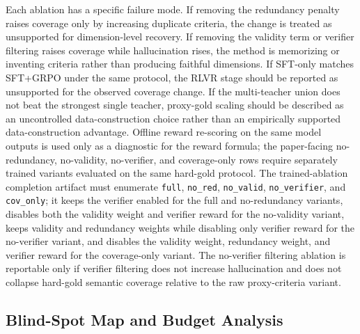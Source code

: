 Each ablation has a specific failure mode. If removing the redundancy penalty
raises coverage only by increasing duplicate criteria, the change is treated as
unsupported for dimension-level recovery. If removing the validity term or
verifier filtering raises coverage while hallucination rises, the method is
memorizing or inventing criteria rather than producing faithful dimensions. If
SFT-only matches SFT+GRPO under the same protocol, the RLVR stage should be
reported as unsupported for the observed coverage change. If the multi-teacher union does
not beat the strongest single teacher, proxy-gold scaling should be described
as an uncontrolled data-construction choice rather than an empirically supported data-construction
advantage.
Offline reward re-scoring on the same model outputs is used only as a diagnostic
for the reward formula; the paper-facing no-redundancy, no-validity,
no-verifier, and coverage-only rows require separately trained variants
evaluated on the same hard-gold protocol.
The trained-ablation completion artifact must enumerate
\texttt{full}, \texttt{no\_red}, \texttt{no\_valid},
\texttt{no\_verifier}, and \texttt{cov\_only}; it keeps the verifier enabled
for the full and no-redundancy variants, disables both the validity weight and
verifier reward for the no-validity variant, keeps validity and redundancy
weights while disabling only verifier reward for the no-verifier variant, and
disables the validity weight, redundancy weight, and verifier reward for the
coverage-only variant. The no-verifier filtering ablation is reportable only if
verifier filtering does not increase hallucination and does not collapse
hard-gold semantic coverage relative to the raw proxy-criteria variant.


\subsection{Blind-Spot Map and Budget Analysis}

